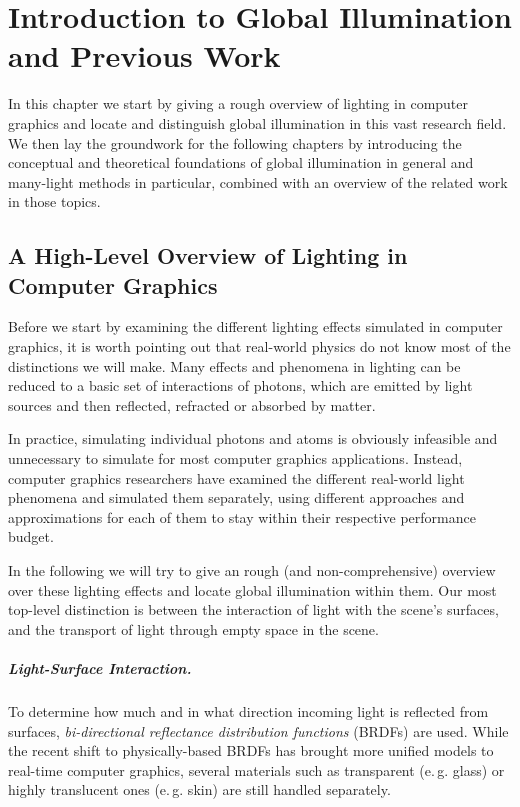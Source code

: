 
\chapter{Introduction to Global Illumination and Previous Work}
\label{chap:introductionGI}

In this chapter we start by giving a rough overview of lighting in computer graphics and locate and distinguish global illumination in this vast research field.
We then lay the groundwork for the following chapters by introducing the conceptual and theoretical foundations of global illumination in general and many-light methods in particular, combined with an overview of the related work in those topics.


\section{A High-Level Overview of Lighting in Computer Graphics}

Before we start by examining the different lighting effects simulated in computer graphics, it is worth pointing out that real-world physics do not know most of the distinctions we will make. Many effects and phenomena in lighting can be reduced to a basic set of interactions of photons, which are emitted by light sources and then reflected, refracted or absorbed by matter.

In practice, simulating individual photons and atoms is obviously infeasible and unnecessary to simulate for most computer graphics applications. Instead, computer graphics researchers have examined the different real-world light phenomena and simulated them separately, using different approaches and approximations for each of them to stay within their respective performance budget.


In the following we will try to give an rough (and non-comprehensive) overview over these lighting effects and locate global illumination within them. Our most top-level distinction is between the interaction of light with the scene's surfaces, and the transport of light through empty space in the scene.

\paragraph{Light-Surface Interaction.}

To determine how much and in what direction incoming light is reflected from surfaces, \textit{bi-directional reflectance distribution functions} (BRDFs) are used. While the recent shift to physically-based BRDFs has brought more unified models to real-time computer graphics, several materials such as transparent (e.\,g. glass) or highly translucent ones (e.\,g. skin) are still handled separately.


